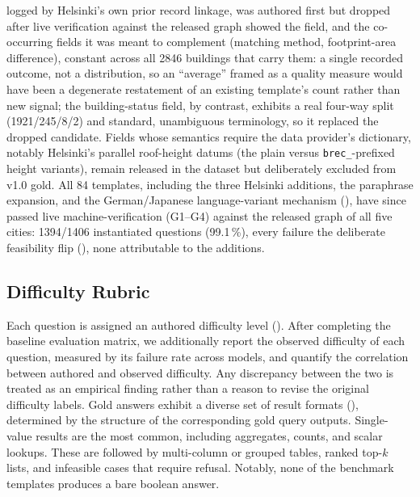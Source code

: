 \documentclass[sigconf,authordraft]{acmart}
\begin{document}
logged by Helsinki's own prior record linkage, was authored first but dropped after live verification against the released graph showed the field, and the co-occurring fields it was meant to complement (matching method, footprint-area difference), constant across all \num{2846} buildings that carry them: a single recorded outcome, not a distribution, so an ``average'' framed as a quality measure would have been a degenerate restatement of an existing template's count rather than new signal; the building-status field, by contrast, exhibits a real four-way split (\num{1921}/\num{245}/\num{8}/\num{2}) and standard, unambiguous terminology, so it replaced the dropped candidate. Fields whose semantics require the data provider's dictionary, notably Helsinki's parallel roof-height datums (the plain versus \texttt{brec\_}-prefixed height variants), remain released in the dataset but deliberately excluded from v1.0 gold. All 84 templates, including the three Helsinki additions, the paraphrase expansion, and the German/Japanese language-variant mechanism (), have since passed live machine-verification (G1--G4) against the released graph of all five cities: \num{1394}/\num{1406} instantiated questions (\num{99.1}\,\%), every failure the deliberate feasibility flip (), none attributable to the additions.

\subsection{Difficulty Rubric}\label{app:questions_difficulty}

Each question is assigned an authored difficulty level (). 
After completing the baseline evaluation matrix, we additionally report the observed difficulty of each question, measured by its failure rate across models, and quantify the correlation between authored and observed difficulty. Any discrepancy between the two is treated as an empirical finding rather than a reason to revise the original difficulty labels.
Gold answers exhibit a diverse set of result formats (), determined by the structure of the corresponding gold query outputs. Single-value results are the most common, including aggregates, counts, and scalar lookups. These are followed by multi-column or grouped tables, ranked top-$k$ lists, and infeasible cases that require refusal. Notably, none of the benchmark templates produces a bare boolean answer.
\end{document}
